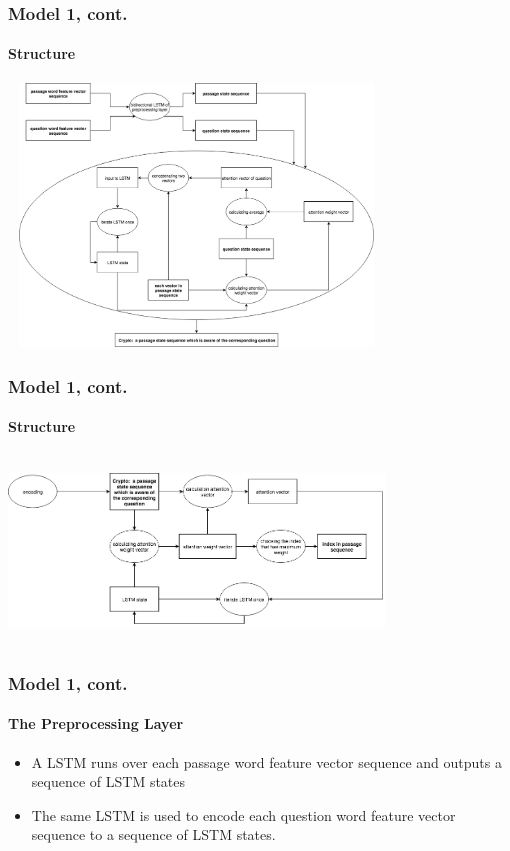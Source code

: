 \documentclass{beamer}
\begin{document}
\begin{frame} \frametitle{Model 1, cont.}\framesubtitle{Structure}
    \begin{center}
        \includegraphics[width=10cm, height=7cm]{figures/model1_encoder.png}
    \end{center}
\end{frame}

\begin{frame} \frametitle{Model 1, cont.}\framesubtitle{Structure}
    \begin{center}
        \includegraphics[width=10cm, height=5cm]{figures/model1_decoder.png}
    \end{center}
\end{frame}

\begin{frame} \frametitle{Model 1, cont.}\framesubtitle{The Preprocessing Layer}

    \begin{itemize}
        \item A LSTM runs over each passage word feature vector sequence and outputs a sequence of LSTM states
        \item The same LSTM is used to encode each question word feature vector sequence to a sequence of LSTM states.
    \end{itemize}
\end{frame}
\end{document}
